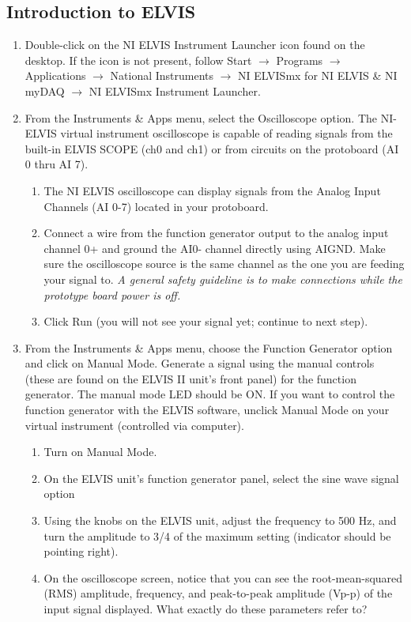 \documentclass{article}
\begin{document}
\subsection*{Introduction to ELVIS}
\begin{enumerate}
	\item Double-click on the NI ELVIS Instrument Launcher icon found on the desktop. If the icon is not present, follow Start $\rightarrow$ Programs $\rightarrow$ Applications $\rightarrow$ National Instruments $\rightarrow$ NI ELVISmx for NI ELVIS \& NI myDAQ $\rightarrow$ NI ELVISmx Instrument Launcher.
	\item From the Instruments \& Apps menu, select the Oscilloscope option. The NI-ELVIS virtual instrument oscilloscope is capable of reading signals from the built-in ELVIS SCOPE (ch0 and ch1) or from circuits on the protoboard (AI 0 thru AI 7).
		\begin{enumerate}
			\item The NI ELVIS oscilloscope can display signals from the Analog Input Channels (AI 0-7) located in your protoboard.
			\item Connect a wire from the function generator output to the analog input channel 0+ and ground the AI0- channel directly using AIGND. Make sure the oscilloscope source is the same channel as the one you are feeding your signal to. \textit{A general safety guideline is to make connections while the prototype board power is off.}
			\item Click Run (you will not see your signal yet; continue to next step).
		\end{enumerate}
	\item From the Instruments \& Apps menu, choose the Function Generator option and click on Manual Mode. Generate a signal using the manual controls (these are found on the ELVIS II unit’s front panel) for the function generator. The manual mode LED should be ON. If you want to control the function generator with the ELVIS software, unclick Manual Mode on your virtual instrument (controlled via computer).
		\begin{enumerate}
			\item Turn on Manual Mode.
			\item On the ELVIS unit’s function generator panel, select the sine wave signal option
			\item Using the knobs on the ELVIS unit, adjust the frequency to 500 Hz, and turn the amplitude to 3/4 of the maximum setting (indicator should be pointing right).
			\item On the oscilloscope screen, notice that you can see the root-mean-squared (RMS) amplitude, frequency, and peak-to-peak amplitude (Vp-p) of the input signal displayed. What exactly do these parameters refer to?

\end{enumerate}
\end{enumerate}
\end{document}
